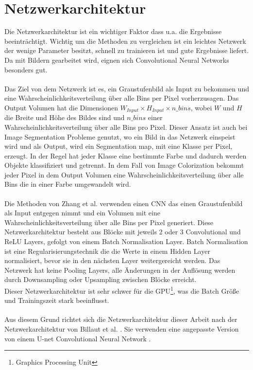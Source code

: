\section{Netzwerkarchitektur}
Die Netzwerkarchitektur ist ein wichtiger Faktor dass u.a. die Ergebnisse beeinträchtigt. Wichtig um die Methoden zu vergleichen ist ein
leichtes Netzwerk der wenige Parameter besitzt, schnell zu trainieren ist und gute Ergebnisse liefert. Da mit Bildern gearbeitet wird, eignen sich
Convolutional Neural Networks besonders gut.
\\
\\
Das Ziel von dem Netzwerk ist es, ein Graustufenbild als Input zu bekommen und eine Wahrscheinlichkeitsverteilung über alle Bins per Pixel vorherzusagen.
Das Output Volumen hat die Dimensionen $ W_{Input} \times H_{Input} \times n\_bins $, wobei $W$ und $H$ die Breite und Höhe des Bildes sind und
$n\_bins$ einer Wahrscheinlichkeitsverteilung über alle Bins pro Pixel. Dieser Ansatz ist auch bei Image Segmentation Probleme genutzt, wo ein Bild
in das Netzwerk einspeist wird und als Output, wird ein Segmentation map, mit eine Klasse per Pixel, erzeugt. In der Regel hat jeder Klasse eine
bestimmte Farbe und dadurch werden Objekte klassifiziert und getrennt. In dem Fall von Image Colorization bekommt jeder Pixel in dem Output Volumen
eine Wahrscheinlichkeitsverteilung über alle Bins die in einer Farbe umgewandelt wird.
\\
\\
Die Methoden von Zhang et al. \cite{zhang2016colorful} verwenden einen \gls{CNN} das einen Graustufenbild als Input entgegen nimmt und ein Volumen mit
eine Wahrscheinlichkeitsverteilung über alle Bins per Pixel generiert. Diese Netzwerkarchitektur besteht aus Blöcke mit jeweils 2 oder 3 Convolutional
und ReLU Layers, gefolgt von einem Batch Normalisation Layer. Batch Normalisation ist eine Regularisierungstechnik die die Werte in einem Hidden Layer
normalisiert, bevor sie in den nächsten Layer weitergereicht werden. Das Netzwerk hat keine Pooling Layers, alle Änderungen in der Auflösung werden durch
Downsampling oder Upsampling zwischen Blöcke erreicht.
\\
Dieser Netzwerkarchitektur ist sehr schwer für die GPU\footnote{Graphics Processing Unit}, was die Batch Größe und Trainingszeit stark beeinflusst.
\\
\\
Aus diesem Grund richtet sich die Netzwerkarchitektur dieser Arbeit nach der Netzwerkarchitektur von Billaut et al. \cite{billaut2018colorunet}. 
Sie verwenden eine angepasste Version von einem U-net Convolutional Neural Network \cite{ronneberger2015unet}. 


